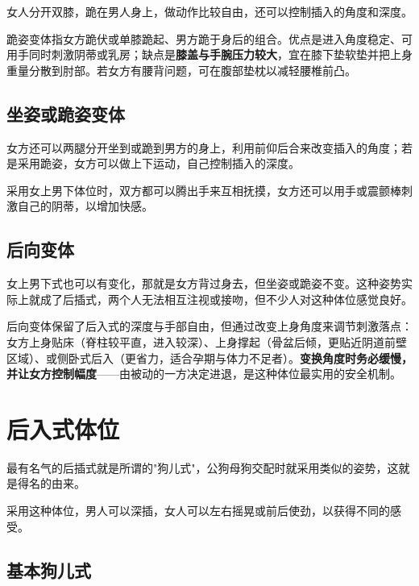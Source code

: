 \documentclass[12pt,UTF8]{ctexbook}
\begin{document}
女人分开双膝，跪在男人身上，做动作比较自由，还可以控制插入的角度和深度。

\vspace{0.5em}

跪姿变体指女方跪伏或单膝跪起、男方跪于身后的组合。优点是进入角度稳定、可用手同时刺激阴蒂或乳房；缺点是\textbf{膝盖与手腕压力较大}，宜在膝下垫软垫并把上身重量分散到肘部。若女方有腰背问题，可在腹部垫枕以减轻腰椎前凸。

\subsection{坐姿或跪姿变体}

女方还可以两腿分开坐到或跪到男方的身上，利用前仰后合来改变插入的角度；若是采用跪姿，女方可以做上下运动，自己控制插入的深度。

采用女上男下体位时，双方都可以腾出手来互相抚摸，女方还可以用手或震颤棒刺激自己的阴蒂，以增加快感。

\vspace{0.5em}
\subsection{后向变体}

女上男下式也可以有变化，那就是女方背过身去，但坐姿或跪姿不变。这种姿势实际上就成了后插式，两个人无法相互注视或接吻，但不少人对这种体位感觉良好。

\vspace{0.5em}

后向变体保留了后入式的深度与手部自由，但通过改变上身角度来调节刺激落点：女方上身贴床（脊柱较平直，进入较深）、上身撑起（骨盆后倾，更贴近阴道前壁区域）、或侧卧式后入（更省力，适合孕期与体力不足者）。\textbf{变换角度时务必缓慢，并让女方控制幅度}——由被动的一方决定进退，是这种体位最实用的安全机制。

\section{后入式体位}

最有名气的后插式就是所谓的"狗儿式"，公狗母狗交配时就采用类似的姿势，这就是得名的由来。

采用这种体位，男人可以深插，女人可以左右摇晃或前后使劲，以获得不同的感受。

\vspace{0.5em}
\subsection{基本狗儿式}
\end{document}
